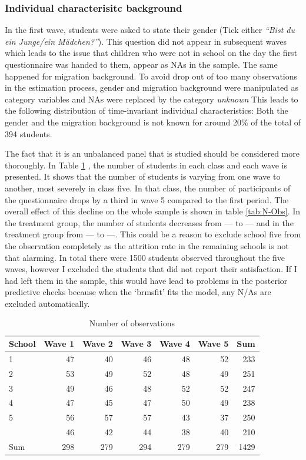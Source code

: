 \documentclass[a4, 12pt]{article}
\begin{document}
\hypertarget{individual-characterisitc-background}{%
\subsubsection{Individual characterisitc background}\label{individual-characterisitc-background}}

In the first wave, students were asked to state their gender (Tick either \emph{``Bist du ein Junge/ein Mädchen?''}). This question did not appear in subsequent waves which leads to the issue that children who were not in school on the day the first questionnaire was handed to them, appear as NAs in the sample. The same happened for migration background. To avoid drop out of too many observations in the estimation process, gender and migration background were manipulated as category variables and NAs were replaced by the category \emph{unknown} This leads to the following distribution of time-invariant individual characteristics: Both the gender and the migration background is not known for around 20\% of the total of 394 students.

The fact that it is an unbalanced panel that is studied should be considered more thoroughly. In Table \ref{tab:N-Obs-per-wave-school} , the number of students in each class and each wave is presented. It shows that the number of students is varying from one wave to another, most severely in class five. In that class, the number of participants of the questionnaire drops by a third in wave 5 compared to the first period. The overall effect of this decline on the whole sample is shown in table \ref{tab:N-Obs}. In the treatment group, the number of students decreases from --- to --- and in the treatment group from --- to ---. This could be a reason to exclude school five from the observation completely as the attrition rate in the remaining schools is not that alarming. In total there were 1500 students observed throughout the five waves, however I excluded the students that did not report their satisfaction. If I had left them in the sample, this would have lead to problems in the posterior predictive checks because when the `brmsfit' fits the model, any N/As are excluded automatically.

\begin{table}

\caption{\label{tab:N-Obs-per-wave-school}Number of observations}
\centering
\begin{tabular}[t]{lrrrrrr}
\toprule
School & Wave 1 & Wave 2 & Wave 3 & Wave 4 & Wave 5 & Sum\\
\midrule
1 & 47 & 40 & 46 & 48 & 52 & 233\\
2 & 53 & 49 & 52 & 48 & 49 & 251\\
3 & 49 & 46 & 48 & 52 & 52 & 247\\
4 & 47 & 45 & 47 & 50 & 49 & 238\\
5 & 56 & 57 & 57 & 43 & 37 & 250\\
\addlinespace
6 & 46 & 42 & 44 & 38 & 40 & 210\\
Sum & 298 & 279 & 294 & 279 & 279 & 1429\\
\bottomrule
\end{tabular}
\end{table}
\end{document}
